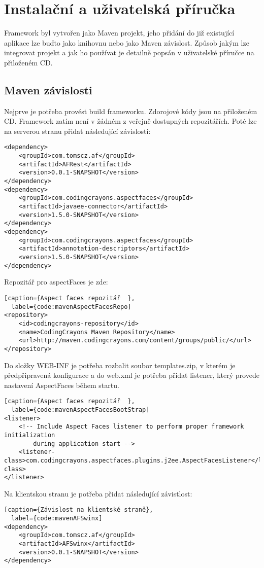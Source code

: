 \chapter{Instalační a uživatelská příručka}
Framework byl vytvořen jako Maven projekt, jeho přidání do již existující aplikace lze buďto jako knihovnu nebo jako Maven závislost. Způsob jakým lze integrovat projekt a jak ho používat je detailně popsán v uživatelské příručce na přiloženém CD. 
\section{Maven závislosti}
Nejprve je potřeba provést build frameworku. Zdorojové kódy jsou na přiloženém CD. Framework zatím není v žádném z veřejně dostupných repozitářích. Poté lze na serverou stranu přidat následující závislosti:
\begin{lstlisting}[caption={Závislosti na serveru},
  label={code:mavenDependency}]
<dependency>
	<groupId>com.tomscz.af</groupId>
	<artifactId>AFRest</artifactId>
	<version>0.0.1-SNAPSHOT</version>
</dependency>
<dependency>
	<groupId>com.codingcrayons.aspectfaces</groupId>
	<artifactId>javaee-connector</artifactId>
	<version>1.5.0-SNAPSHOT</version>
</dependency>
<dependency>
	<groupId>com.codingcrayons.aspectfaces</groupId>
	<artifactId>annotation-descriptors</artifactId>
	<version>1.5.0-SNAPSHOT</version>
</dependency>
\end{lstlisting}
Repozitář pro aspectFaces je zde:
\begin{lstlisting}[caption={Aspect faces repozitář	},
  label={code:mavenAspectFacesRepo]
<repository>
	<id>codingcrayons-repository</id>
	<name>CodingCrayons Maven Repository</name>
	<url>http://maven.codingcrayons.com/content/groups/public/</url>
</repository>
\end{lstlisting}
Do složky WEB-INF je potřeba rozbalit soubor templates.zip, v kterém je předpřipravená konfigurace a do web.xml je potřeba přidat listener, který provede nastavení AspectFaces během startu. 
\begin{lstlisting}[caption={Aspect faces repozitář	},
  label={code:mavenAspectFacesBootStrap]
<listener>
	<!-- Include Aspect Faces listener to perform proper framework initialization 
		during application start -->
	<listener-class>com.codingcrayons.aspectfaces.plugins.j2ee.AspectFacesListener</listener-class>
</listener>
\end{lstlisting}
Na klientskou stranu je potřeba přidat následující závistlost:
\begin{lstlisting}[caption={Závislost na klientské straně},
  label={code:mavenAFSwinx]
<dependency>
	<groupId>com.tomscz.af</groupId>
	<artifactId>AFSwinx</artifactId>
	<version>0.0.1-SNAPSHOT</version>
</dependency>
\end{lstlisting}
